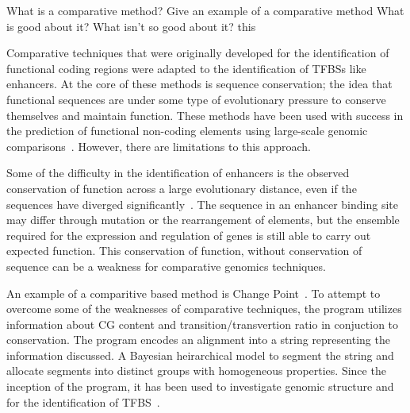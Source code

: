 


        What is a comparative method?
        Give an example of a comparative method
        What is good about it?
        What isn't so good about it? this


        Comparative techniques that were originally developed for the identification of functional coding regions were adapted to the identification of TFBSs like enhancers. At the core of these methods is sequence conservation; the idea that functional sequences are under some type of evolutionary pressure to conserve themselves and maintain function. These methods have been used with success in the prediction of functional non-coding elements using large-scale genomic comparisons~\cite{aparicio2002whole, gottgens2000analysis, loots 2000identification, mouse2002initial}. However, there are limitations to this approach.

        Some of the difficulty in the identification of enhancers is the observed conservation of function across a large evolutionary distance, even if the sequences have diverged significantly~\cite{tautz2000evolution}. The sequence in an enhancer binding site may differ through mutation or the rearrangement of elements, but the ensemble required for the expression and regulation of genes is still able to carry out expected function. This conservation of function, without conservation of sequence can be a weakness for comparative genomics techniques. 

        An example of a comparitive based method is Change Point~\cite{keith2006segmenting}. To attempt to overcome some of the weaknesses of comparative techniques, the program utilizes information about CG content and transition/transvertion ratio in conjuction to conservation. The program encodes an alignment into a string representing the information discussed. A Bayesian heirarchical model to segment the string and allocate segments into distinct groups with homogeneous properties. Since the inception of the program, it has been used to investigate genomic structure and for the identification of TFBS~\cite{alagma2014investigating, algama2017genome}. 

